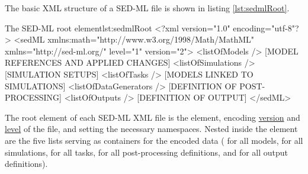The basic XML structure of a SED-ML file is shown in listing  \vref{lst:sedmlRoot}.
%
\begin{myXmlLst}{The SED-ML root element}{lst:sedmlRoot}
<?xml version="1.0" encoding="utf-8"?>
<sedML xmlns:math="http://www.w3.org/1998/Math/MathML" 
       xmlns="http://sed-ml.org/" level="1" version="2">
 <listOfModels />
  [MODEL REFERENCES AND APPLIED CHANGES]
 <listOfSimulations />
  [SIMULATION SETUPS]
 <listOfTasks />
  [MODELS LINKED TO SIMULATIONS]
 <listOfDataGenerators />
  [DEFINITION OF POST-PROCESSING]
 <listOfOutputs />
  [DEFINITION OF OUTPUT]
</sedML>
\end{myXmlLst}
%
The root element of each SED-ML XML file is the  element, encoding \hyperref[sec:version]{version} and \hyperref[sec:level]{level} of the file, and setting the necessary namespaces. Nested inside the  element are the five lists serving as containers for the encoded data ( for all models,  for all simulations,  for all tasks,  for all post-processing definitions, and  for all output definitions).








